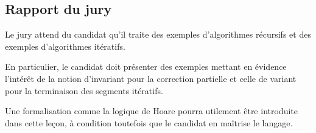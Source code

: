 \documentclass[../../Agregation.tex]{subfiles}
\begin{document}

\subsection{Rapport du jury}

\begin{aquote}{}
Le jury attend du candidat qu'il traite des exemples d'algorithmes récursifs et des exemples d'algorithmes itératifs.

En particulier, le candidat doit présenter des exemples mettant en évidence l'intérêt de la notion d'invariant pour la correction partielle et celle de variant pour la terminaison des segments itératifs.

Une formalisation comme la logique de Hoare pourra utilement être introduite dans cette leçon, à condition toutefois que le candidat en maîtrise le langage.
\end{aquote}
\end{document}
